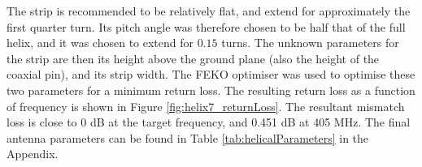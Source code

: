 The strip is recommended to be relatively flat, and extend for approximately the first quarter turn. Its pitch angle was therefore chosen to be half that of the full helix, and it was chosen to extend for $0.15$ turns. The unknown parameters for the strip are then its height above the ground plane (also the height of the coaxial pin), and its strip width. The FEKO optimiser was used to optimise these two parameters for a minimum return loss. The resulting return loss as a function of frequency is shown in Figure \ref{fig:helix7_returnLoss}. The resultant mismatch loss is close to 0 dB at the target frequency, and 0.451 dB at 405 MHz. The final antenna parameters can be found in Table \ref{tab:helicalParameters} in the Appendix.